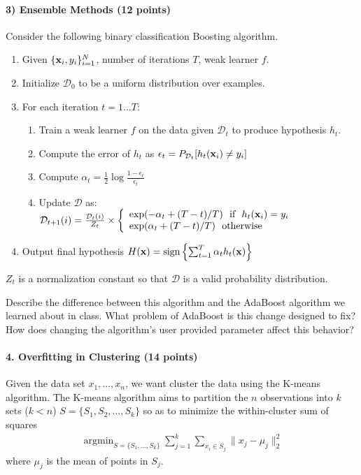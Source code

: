 \documentclass[11pt]{article}
\newcommand{\vx}{{\bf x}}
\newcommand{\vxi}{{\bf x}_i}
\newcommand{\yi}{y_i}
\newcommand{\D}{\mathcal{D}}
\begin{document}
	\paragraph{3) Ensemble Methods (12 points)}
	
	Consider the following binary classification Boosting algorithm.
	\begin{enumerate}
		\item Given $\{\vxi, \yi\}_{i=1}^N$, number of iterations $T$, weak learner $f$.
		\item Initialize $\D_0$ to be a uniform distribution over examples.
		\item For each iteration $t = 1 \ldots T$:
		\begin{enumerate}
			\item Train a weak learner $f$ on the data given $\D_t$ to produce hypothesis $h_t$.
			\item Compute the error of $h_t$ as $\epsilon_t = P_{\D_t} [h_t(\vxi) \ne \yi]$
			\item Compute $\alpha_t = \frac{1}{2} \log \frac{1-\epsilon_t}{\epsilon_t}$
			\item Update $\D$ as:\\
			$\D_{t+1}(i) = \frac{\D_t(i)}{Z_t} \times \left\{
			\begin{array}{lr}
			\exp(-\alpha_t + (T-t) / T) ~~  \textrm{if} ~~ h_t(\vxi) = \yi  \\
			\exp(\alpha_t + (T-t) / T) ~~ \textrm{otherwise}
			\end{array}
			\right.$
		\end{enumerate}
		\item Output final hypothesis $H(\vx)=\textrm{sign} \left\{ \sum_{t=1}^T \alpha_t h_t(\vx) \right\}$
	\end{enumerate}
	
	$Z_t$ is a normalization constant so that $\D$ is a valid probability distribution.
	
	Describe the difference between this algorithm and the AdaBoost algorithm we learned about in class. What problem of AdaBoost is this change designed to fix? How does changing the algorithm's user provided parameter affect this behavior?
	
	\paragraph{4. Overfitting in Clustering (14 points)}
	
	Given the data set $x_1,...,x_n$, we want cluster the data using the K-means algorithm. The K-means algorithm aims to partition the $n$ observations into $k$ sets ($k < n$) $S = \{S_1, S_2, \ldots, S_k\}$ so as to minimize the within-cluster sum of squares
	\begin{eqnarray}
	\mathop{\textrm{argmin}}_{S=\{S_1,...,S_k\}}\sum_{j=1}^k\sum_{x_i\in S_j}\|x_j-\mu_j\|_2^2
	\label{objective1}
	\end{eqnarray}
	where $\mu_j$ is the mean of points in $S_j$.
	
\end{document}
